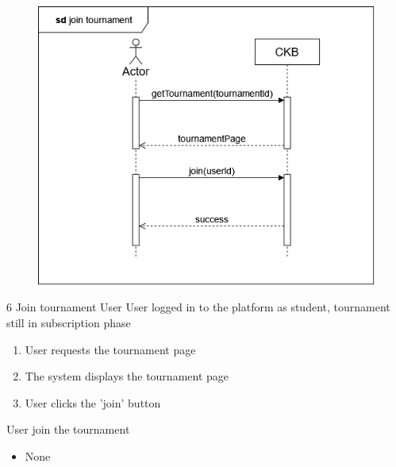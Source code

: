 \usecase
{
    \begin{figure}[H]
        \centering
        \includegraphics[width=\textwidth]{src/sequence_diagrams/jointourn.png}
    \end{figure}
}
{6}
{Join tournament} %
{User} %
{User logged in to the platform as student, tournament still in subscription phase} %
{ %
    \begin{enumerate}
        \item User requests the tournament page
        \item The system displays the tournament page
        \item User clicks the 'join' button
    \end{enumerate}
}
{User join the tournament} %
{ %
    \begin{itemize}
        \item None
    \end{itemize}
}
{ %

}

